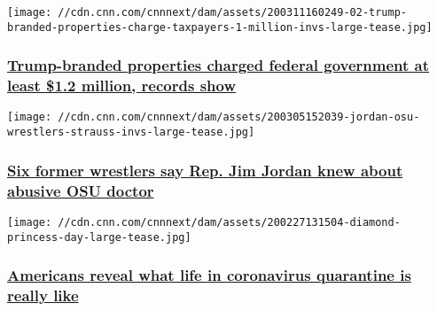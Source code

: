 \href{/2020/03/12/politics/trump-branded-properties-charge-taxpayers-a-million-invs/index.html}{}

\texttt{[image: //cdn.cnn.com/cnnnext/dam/assets/200311160249-02-trump-branded-properties-charge-taxpayers-1-million-invs-large-tease.jpg]}

\hypertarget{trump-branded-properties-charged-federal-government-at-least-12-million-records-show}{%
\subsubsection{\texorpdfstring{\href{/2020/03/12/politics/trump-branded-properties-charge-taxpayers-a-million-invs/index.html}{Trump-branded
properties charged federal government at least \$1.2 million, records
show}}{Trump-branded properties charged federal government at least \$1.2 million, records show}}\label{trump-branded-properties-charged-federal-government-at-least-12-million-records-show}}

\href{/2020/03/06/politics/jordan-osu-wrestlers-strauss-invs/index.html}{}

\texttt{[image: //cdn.cnn.com/cnnnext/dam/assets/200305152039-jordan-osu-wrestlers-strauss-invs-large-tease.jpg]}

\hypertarget{six-former-wrestlers-say-rep-jim-jordan-knew-about-abusive-osu-doctor}{%
\subsubsection{\texorpdfstring{\href{/2020/03/06/politics/jordan-osu-wrestlers-strauss-invs/index.html}{Six
former wrestlers say Rep. Jim Jordan knew about abusive OSU
doctor}}{Six former wrestlers say Rep. Jim Jordan knew about abusive OSU doctor}}\label{six-former-wrestlers-say-rep-jim-jordan-knew-about-abusive-osu-doctor}}

\href{/2020/03/05/us/coronavirus-passengers-describe-life-in-quarantine-invs/index.html}{}

\texttt{[image: //cdn.cnn.com/cnnnext/dam/assets/200227131504-diamond-princess-day-large-tease.jpg]}

\hypertarget{americans-reveal-what-life-in-coronavirus-quarantine-is-really-like}{%
\subsubsection{\texorpdfstring{\href{/2020/03/05/us/coronavirus-passengers-describe-life-in-quarantine-invs/index.html}{Americans
reveal what life in coronavirus quarantine is really
like}}{Americans reveal what life in coronavirus quarantine is really like}}\label{americans-reveal-what-life-in-coronavirus-quarantine-is-really-like}}

